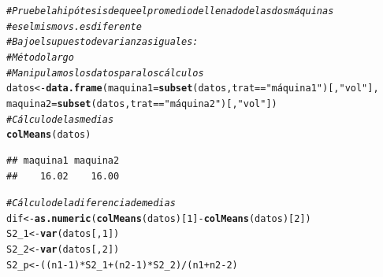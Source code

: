 \documentclass[a4paper]{scrartcl}\usepackage[]{graphicx}\usepackage[]{color}
\makeatletter
\newcommand{\hlnum}[1]{\textcolor[rgb]{0.686,0.059,0.569}{#1}}%
\newcommand{\hlstr}[1]{\textcolor[rgb]{0.192,0.494,0.8}{#1}}%
\newcommand{\hlcom}[1]{\textcolor[rgb]{0.678,0.584,0.686}{\textit{#1}}}%
\newcommand{\hlopt}[1]{\textcolor[rgb]{0,0,0}{#1}}%
\newcommand{\hlstd}[1]{\textcolor[rgb]{0.345,0.345,0.345}{#1}}%
\newcommand{\hlkwb}[1]{\textcolor[rgb]{0.69,0.353,0.396}{#1}}%
\newcommand{\hlkwc}[1]{\textcolor[rgb]{0.333,0.667,0.333}{#1}}%
\newcommand{\hlkwd}[1]{\textcolor[rgb]{0.737,0.353,0.396}{\textbf{#1}}}%
\newenvironment{kframe}{%
 \def\at@end@of@kframe{}%
 \ifinner\ifhmode%
  \def\at@end@of@kframe{\end{minipage}}%
  \begin{minipage}{\columnwidth}%
 \fi\fi%
 \def\FrameCommand##1{\hskip\@totalleftmargin \hskip-\fboxsep
 \colorbox{shadecolor}{##1}\hskip-\fboxsep
     \hskip-\linewidth \hskip-\@totalleftmargin \hskip\columnwidth}%
 \MakeFramed {\advance\hsize-\width
   \@totalleftmargin\z@ \linewidth\hsize
   \@setminipage}}%
 {\par\unskip\endMakeFramed%
 \at@end@of@kframe}
\newenvironment{knitrout}{}{} %
\makeatother
\begin{document}
\begin{knitrout}
\color{fgcolor}\begin{kframe}
\begin{alltt}
\hlcom{# Pruebe la hipótesis de que el promedio de llenado de las dos máquinas }
\hlcom{# es el mismo vs. es diferente}
\hlcom{# Bajo el supuesto de varianzas iguales:}
\hlcom{# Método largo}
\hlcom{# Manipulamos los datos para los cálculos}
\hlstd{datos} \hlkwb{<-} \hlkwd{data.frame}\hlstd{(}\hlkwc{maquina1}\hlstd{=}\hlkwd{subset}\hlstd{(datos, trat} \hlopt{==} \hlstr{"máquina 1"}\hlstd{)[,} \hlstr{"vol"}\hlstd{],}
                    \hlkwc{maquina2}\hlstd{=}\hlkwd{subset}\hlstd{(datos, trat} \hlopt{==} \hlstr{"máquina 2"}\hlstd{)[,} \hlstr{"vol"}\hlstd{])}
\hlcom{# Cálculo de las medias}
\hlkwd{colMeans}\hlstd{(datos)}
\end{alltt}
\begin{verbatim}
## maquina1 maquina2 
##    16.02    16.00
\end{verbatim}
\begin{alltt}
\hlcom{# Cálculo de la diferencia de medias}
\hlstd{dif} \hlkwb{<-} \hlkwd{as.numeric}\hlstd{(}\hlkwd{colMeans}\hlstd{(datos)[}\hlnum{1}\hlstd{]} \hlopt{-} \hlkwd{colMeans}\hlstd{(datos)[}\hlnum{2}\hlstd{])}
\hlstd{S2_1} \hlkwb{<-} \hlkwd{var}\hlstd{(datos[,} \hlnum{1}\hlstd{])}
\hlstd{S2_2} \hlkwb{<-} \hlkwd{var}\hlstd{(datos[,} \hlnum{2}\hlstd{])}
\hlstd{S2_p} \hlkwb{<-} \hlstd{((n1} \hlopt{-} \hlnum{1}\hlstd{)} \hlopt{*} \hlstd{S2_1} \hlopt{+} \hlstd{(n2} \hlopt{-} \hlnum{1}\hlstd{)} \hlopt{*} \hlstd{S2_2)} \hlopt{/} \hlstd{(n1} \hlopt{+} \hlstd{n2} \hlopt{-} \hlnum{2}\hlstd{)}


\end{alltt}
\end{kframe}
\end{knitrout}
\end{document}
